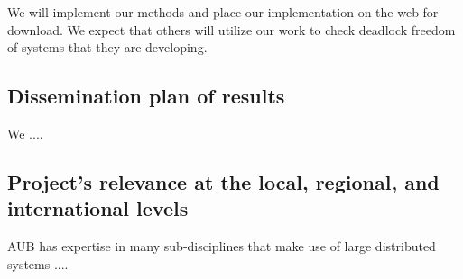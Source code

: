We will implement our methods and place our implementation on the web
for download. We expect that others will utilize our work to check deadlock
freedom of systems that they are developing.



\subsection{Dissemination plan of results}

We ....


\subsection{Project's relevance at the local, regional, and international levels}

AUB has expertise in many sub-disciplines that make use of large
distributed systems ....


